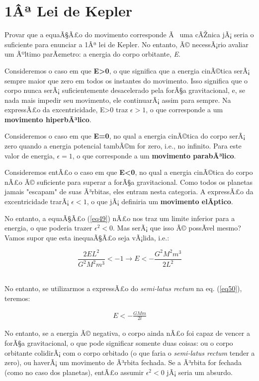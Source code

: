 \section{1Âª Lei de Kepler}

Provar que a equaÃ§Ã£o do movimento corresponde Ã  uma cÃŽnica jÃ¡ seria o suficiente para enunciar a 1Âª lei de Kepler. No entanto, Ã© necessÃ¡rio avaliar um Ãºltimo parÃ¢metro: a energia do corpo orbitante, \textit{E}.{\\}

Consideremos o caso em que \textbf{E>0}, o que significa que a energia cinÃ©tica serÃ¡ sempre maior que zero em todos os instantes do movimento. Isso significa que o corpo nunca serÃ¡ suficientemente desacelerado pela forÃ§a gravitacional, e, se nada mais impedir seu movimento, ele continuarÃ¡ assim para sempre. Na expressÃ£o da excentricidade, E>0 traz $\epsilon>1$, o que corresponde a um \textbf{movimento hiperbÃ³lico}. {\\}

Consideremos o caso em que \textbf{E=0}, no qual a energia cinÃ©tica do corpo serÃ¡ zero quando a energia potencial tambÃ©m for zero, i.e., no infinito. Para este valor de energia, $\epsilon=1$, o que corresponde a um \textbf{movimento parabÃ³lico}. {\\}

Consideremos entÃ£o o caso em que \textbf{E<0}, no qual a energia cinÃ©tica do corpo nÃ£o Ã© suficiente para superar a forÃ§a gravitacional. Como todos os planetas jamais "escapam" de suas Ã³rbitas, eles entram nesta categoria. A expressÃ£o da excentricidade trarÃ¡ $\epsilon<1$, o que jÃ¡ definiria um \textbf{movimento elÃ­ptico}.{\\}

No entanto, a equaÃ§Ã£o (\ref{eq49}) nÃ£o nos traz um limite inferior para a energia, o que poderia trazer $\epsilon^2<0$. Mas serÃ¡ que isso Ã© possÃ­vel mesmo? Vamos supor que esta inequaÃ§Ã£o seja vÃ¡lida, i.e.:

\[
	\frac{2EL^2}{G^2M^2m^3}<-1 \rightarrow E<-\frac{G^2M^2m^3}{2L^2}
\]{\\}

No entanto, se utilizarmos a expressÃ£o do \textit{semi-latus rectum} na eq. (\ref{eq50}), teremos:

\begin{eqnarray}
	E<-\frac{GMm}{2l}		\label{eq51}
\end{eqnarray}

No entanto, se a energia Ã© negativa, o corpo ainda nÃ£o foi capaz de vencer a forÃ§a gravitacional, o que pode significar somente duas coisas: ou o corpo orbitante colidirÃ¡ com o corpo orbitado (o que faria o \textit{semi-latus rectum} tender a zero), ou haverÃ¡ um movimento de Ã³rbita fechada. Se a Ã³rbita for fechada (como no caso dos planetas), entÃ£o assumir $\epsilon^2<0$ jÃ¡ seria um absurdo. {\\}

